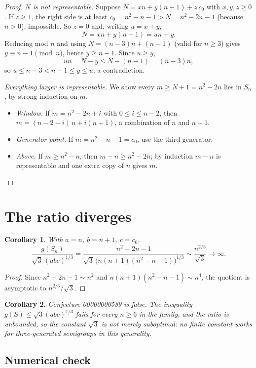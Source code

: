 \documentclass[11pt]{article}
\newtheorem{corollary}{Corollary}
\begin{document}
\begin{proof}
\emph{$N$ is not representable.} Suppose
$N=xn+y(n{+}1)+z\,c_0$ with $x,y,z\ge 0$.
If $z\ge 1$, the right side is at least $c_0=n^2-n-1>N=n^2-2n-1$
(because $n>0$), impossible. So $z=0$ and, writing $u=x+y$,
\[
N = xn+y(n{+}1) = un+y .
\]
Reducing mod $n$ and using $N=(n-3)n+(n-1)$ (valid for $n\ge 3$) gives
$y\equiv n-1\pmod n$, hence $y\ge n-1$. Since $u\ge y$,
\[
un = N-y \le N-(n-1) = (n-3)n,
\]
so $u\le n-3<n-1\le y\le u$, a contradiction.

\emph{Everything larger is representable.} We show every $m\ge N+1=n^2-2n$
lies in $S_n$, by strong induction on $m$.
\begin{itemize}
\item \emph{Window.} If $m=n^2-2n+i$ with $0\le i\le n-2$, then
$m=(n-2-i)\,n+i(n{+}1)$, a combination of $n$ and $n+1$.
\item \emph{Generator point.} If $m=n^2-n-1=c_0$, use the third generator.
\item \emph{Above.} If $m\ge n^2-n$, then $m-n\ge n^2-2n$; by induction
$m-n$ is representable and one extra copy of $n$ gives $m$.
\end{itemize}
\end{proof}

\section{The ratio diverges}

\begin{corollary}\label{cor:ratio}
With $a=n$, $b=n+1$, $c=c_0$,
\[
\frac{g(S_n)}{\sqrt3\,(abc)^{1/3}}
=\frac{n^2-2n-1}{\sqrt3\,\bigl(n(n+1)(n^2-n-1)\bigr)^{1/3}}
\sim \frac{n^{2/3}}{\sqrt3}\to\infty .
\]
\end{corollary}

\begin{proof}
Since $n^2-2n-1\sim n^2$ and $n(n+1)(n^2-n-1)\sim n^4$, the quotient is
asymptotic to $n^{2/3}/\sqrt3$.
\end{proof}

\begin{corollary}
Conjecture 00000000589 is false. The inequality
$g(S)\le\sqrt3(abc)^{1/3}$ fails for every $n\ge 6$ in the family, and the
ratio is unbounded, so the constant $\sqrt3$ is not merely suboptimal: no
finite constant works for three-generated semigroups in this generality.
\end{corollary}

\subsection*{Numerical check}
\end{document}

